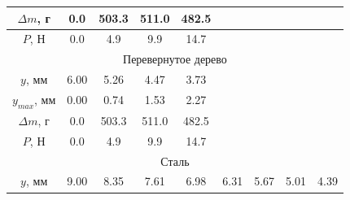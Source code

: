 \documentclass[12pt]{article}
\begin{document}
\begin{enumerate}
\begin{table}
\begin{tabular}{|ccccccccc|}
            \multicolumn{1}{|c|}{$\Delta m$, г} & \multicolumn{1}{c|}{0.0}  & \multicolumn{1}{c|}{503.3} & \multicolumn{1}{c|}{511.0} & \multicolumn{1}{c|}{482.5} & \multicolumn{1}{c|}{}      & \multicolumn{1}{c|}{}      & \multicolumn{1}{c|}{}      &       \\ \hline
            \multicolumn{1}{|c|}{$P$, Н}        & \multicolumn{1}{c|}{0.0}  & \multicolumn{1}{c|}{4.9}   & \multicolumn{1}{c|}{9.9}   & \multicolumn{1}{c|}{14.7}  & \multicolumn{1}{c|}{}      & \multicolumn{1}{c|}{}      & \multicolumn{1}{c|}{}      &       \\ \hline
            \multicolumn{9}{|c|}{Перевернутое дерево}                                                                                                                                                                                                             \\ \hline
            \multicolumn{1}{|c|}{$y$, мм}       & \multicolumn{1}{c|}{6.00} & \multicolumn{1}{c|}{5.26}  & \multicolumn{1}{c|}{4.47}  & \multicolumn{1}{c|}{3.73}  & \multicolumn{1}{c|}{}      & \multicolumn{1}{c|}{}      & \multicolumn{1}{c|}{}      &       \\ \hline
            \multicolumn{1}{|c|}{$y_{max}$, мм} & \multicolumn{1}{c|}{0.00} & \multicolumn{1}{c|}{0.74}  & \multicolumn{1}{c|}{1.53}  & \multicolumn{1}{c|}{2.27}  & \multicolumn{1}{c|}{}      & \multicolumn{1}{c|}{}      & \multicolumn{1}{c|}{}      &       \\ \hline
            \multicolumn{1}{|c|}{$\Delta m$, г} & \multicolumn{1}{c|}{0.0}  & \multicolumn{1}{c|}{503.3} & \multicolumn{1}{c|}{511.0} & \multicolumn{1}{c|}{482.5} & \multicolumn{1}{c|}{}      & \multicolumn{1}{c|}{}      & \multicolumn{1}{c|}{}      &       \\ \hline
            \multicolumn{1}{|c|}{$P$, Н}        & \multicolumn{1}{c|}{0.0}  & \multicolumn{1}{c|}{4.9}   & \multicolumn{1}{c|}{9.9}   & \multicolumn{1}{c|}{14.7}  & \multicolumn{1}{c|}{}      & \multicolumn{1}{c|}{}      & \multicolumn{1}{c|}{}      &       \\ \hline
            \multicolumn{9}{|c|}{Сталь}                                                                                                                                                                                                                           \\ \hline
            \multicolumn{1}{|c|}{$y$, мм}       & \multicolumn{1}{c|}{9.00} & \multicolumn{1}{c|}{8.35}  & \multicolumn{1}{c|}{7.61}  & \multicolumn{1}{c|}{6.98}  & \multicolumn{1}{c|}{6.31}  & \multicolumn{1}{c|}{5.67}  & \multicolumn{1}{c|}{5.01}  & 4.39  \\ \hline

\end{tabular}
\end{table}
\end{enumerate}
\end{document}
